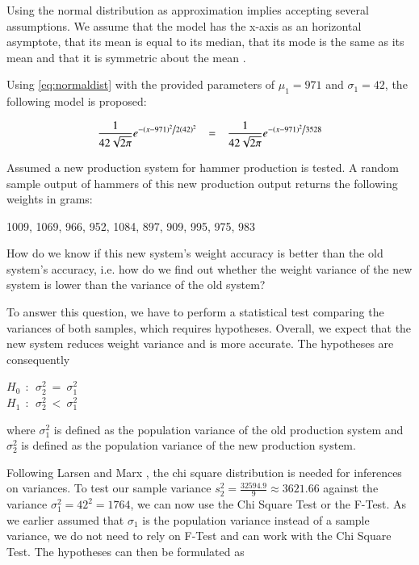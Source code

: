 Using the normal distribution as approximation implies accepting several assumptions. We assume that the model has the x-axis as an horizontal asymptote, that its mean is equal to its median, that its mode is the same as its mean and that it is symmetric about the mean \cite[Chapter~3.4]{hogg}.

Using \ref{eq:normaldist} with the provided parameters of $\mu_1 = 971$ and $\sigma_1 = 42$, the following model is proposed: 

\begin{equation} \frac{1}{{42 \sqrt {2\pi } }}e^{{{ - \left( {x - 971 } \right)^2 } \mathord{\left/ {\vphantom {{ - \left( {x - 971 } \right)^2 } {2(42) ^2 }}} \right. \kern-\nulldelimiterspace}{2(42) ^2 }}} ~~~=~~~ \frac{1}{{42 \sqrt {2\pi } }}e^{{{ - \left( {x - 971 } \right)^2 } \mathord{\left/ {\vphantom {{ - \left( {x - 971 } \right)^2 } {7056 }}} \right. \kern-\nulldelimiterspace}{3528 }}}
\label{eq:normaldistadapted}
\end{equation}



Assumed a new production system for hammer production is tested. A random sample output of hammers of this new production output returns the following weights in grams: \\

\begin{center}
    1009, 1069, 966, 952, 1084, 897, 909, 995, 975, 983
\end{center}

How do we know if this new system's weight accuracy is better than the old system's accuracy, i.e. how do we find out whether the weight variance of the new system is lower than the variance of the old system?

To answer this question, we have to perform a statistical test comparing the variances of both samples, which requires hypotheses. Overall, we expect that the new system reduces weight variance and is more accurate. The hypotheses are consequently 

\begin{center}
$H_0~~:~~ \sigma^2_2~=~\sigma^2_1$\\ 
$H_1~~:~~ \sigma^2_2~<~\sigma^2_1$
\end{center}

where $\sigma^2_1$ is defined as the population variance of the old production system and $\sigma^2_2$ is defined as the population variance of the new production system.

Following Larsen and Marx \cite[Chapter 7.5]{larsen2005introduction}, the chi square distribution is needed for inferences on variances. To test our sample variance $s_2^2 = \frac{32594.9}{9} \approx 3621.66 $ against the variance $\sigma^2_1 = 42^2 = 1764$, we can now use the Chi Square Test or the F-Test. As we earlier assumed that $\sigma_1$ is the population variance instead of a sample variance, we do not need to rely on F-Test and can work with the Chi Square Test. The hypotheses can then be formulated as 

